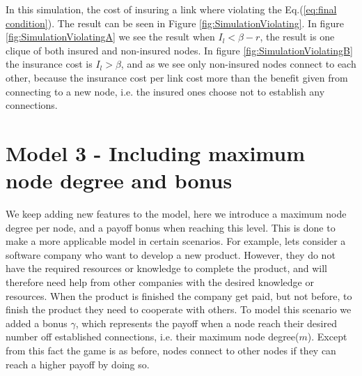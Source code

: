 In this simulation, the cost of insuring a link where violating the Eq.(\ref{eq:final condition}). The result can be seen in Figure \ref{fig:SimulationViolating}.  In figure \ref{fig:SimulationViolatingA} we see the result when $I_{l}<\beta-r$, the result is one clique of both insured and non-insured nodes. In figure \ref{fig:SimulationViolatingB} the insurance cost is $I_{l}>\beta$, and as we see only non-insured nodes connect to each other, because the insurance cost per link cost more than the benefit given from connecting to a new node, i.e. the insured ones choose not to establish any connections. 




\section{Model 3 - Including maximum node degree and bonus}
We keep adding new features to the model, here we introduce a maximum node degree per node, and a payoff bonus when reaching this level. This is done to make a more applicable model in certain scenarios. For example, lets consider a software company who want to develop a new product. However, they do not have the required resources or knowledge to complete the product, and will therefore need help from other companies with the desired knowledge or resources. When the product is finished the company get paid, but not before, to finish the product they need to cooperate with others.
To model this scenario we added a bonus $\gamma$, which represents the payoff when a node reach their desired number off established connections, i.e. their maximum node degree($m$). Except from this fact the game is as before, nodes connect to other nodes if they can reach a higher payoff by doing so. 



